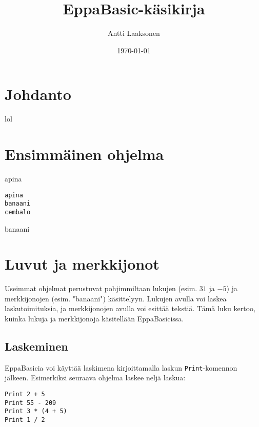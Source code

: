 \documentclass[oneside,11pt,a4paper,finnish]{book}
\date{\Large \today}
\title{\Huge EppaBasic-käsikirja}
\author{\Large Antti Laaksonen}
\begin{document}

\setcounter{page}{1}

\frontmatter
\maketitle
\setcounter{tocdepth}{0}
\tableofcontents

\setcounter{page}{1}
\mainmatter

\newcommand{\kuva}[1] {
\vspace{10px}
\begin{center}
\texttt{[image: \#1.png]}
\end{center}
}

\chapter*{Johdanto}
lol


\chapter{Ensimmäinen ohjelma}

apina


\begin{verbatim}
apina
banaani
cembalo
\end{verbatim}

banaani

\chapter{Luvut ja merkkijonot}

Useimmat ohjelmat perustuvat pohjimmiltaan
lukujen (esim. $31$ ja $-5$) ja merkkijonojen (esim. "banaani") käsittelyyn.
Lukujen avulla voi laskea laskutoimituksia,
ja merkkijonojen avulla voi esittää tekstiä.
Tämä luku kertoo, kuinka lukuja ja merkkijonoja
käsitellään EppaBasicissa.

\section{Laskeminen}

EppaBasicia voi käyttää laskimena kirjoittamalla laskun
\texttt{Print}-komennon jälkeen.
Esimerkiksi seuraava ohjelma laskee neljä laskua:

\begin{verbatim}
Print 2 + 5
Print 55 - 209
Print 3 * (4 + 5)
Print 1 / 2
\end{verbatim}
\end{document}
